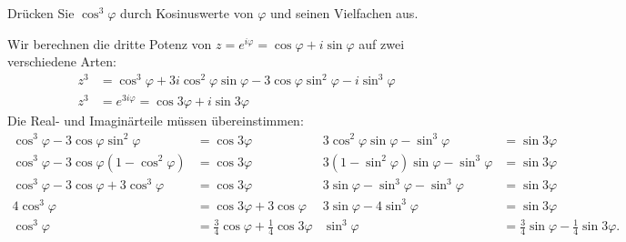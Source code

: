 Drücken Sie $\cos^3\varphi$ durch Kosinuswerte von $\varphi$ und seinen
Vielfachen aus.

\begin{loesung}
Wir berechnen die dritte Potenz von $z=e^{i\varphi}=\cos\varphi+i\sin\varphi$
auf zwei verschiedene Arten:
\begin{align*}
z^3
&=
\cos^3\varphi + 3i\cos^2\varphi\sin\varphi - 3 \cos\varphi\sin^2\varphi
-i\sin^3\varphi
\\
z^3
&=
e^{3i\varphi}=\cos3\varphi+i\sin3\varphi
\end{align*}
Die Real- und Imaginärteile müssen übereinstimmen:
\begin{align*}
\cos^3\varphi-3\cos\varphi\sin^2\varphi
&=
\cos3\varphi
&
3\cos^2\varphi\sin\varphi-\sin^3\varphi
&=
\sin3\varphi
\\
\cos^3\varphi-3\cos\varphi(1-\cos^2\varphi)
&=
\cos3\varphi
&
3(1-\sin^2\varphi)\sin\varphi-\sin^3\varphi
&=
\sin3\varphi
\\
\cos^3\varphi-3\cos\varphi + 3\cos^3\varphi
&=
\cos3\varphi
&
3\sin\varphi -\sin^3\varphi-\sin^3\varphi
&=
\sin3\varphi
\\
4\cos^3\varphi
&=
\cos3\varphi
+
3\cos\varphi
&
3\sin\varphi -4\sin^3\varphi
&=
\sin3\varphi
\\
\cos^3\varphi
&=
\frac34 \cos\varphi
+
\frac14 \cos3\varphi
&
\sin^3\varphi
&=
\frac34 \sin\varphi
-
\frac14\sin3\varphi.
\end{align*}
\end{loesung}

